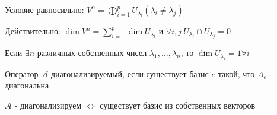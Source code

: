 \documentclass[12pt]{article}
\begin{document}
    \Nota Условие \Ths равносильно: $V^n = \bigoplus_{i=1}^p U_{\lambda_i} (\lambda_i \neq \lambda_j)$

    Действительно: $\dim V^n = \sum_{i=1}^p \dim U_{\lambda_i}$ и $\forall i, j \ U_{\lambda_i} \cap U_{\lambda_j} = 0$

    \Ex Если $\exists n$ различных собственных чисел $\lambda_1, \dots, \lambda_n$, то $\dim U_{\lambda_i} = 1 \forall i$

    \Def Оператор $\mathcal{A}$ диагонализируемый, если существует базис $e$ такой, что $A_e$ - диагональна

    \hypertarget{diagonalizedmatrixtheorem}{}

    \begin{MyTheorem}
        \Ths $\mathcal{A}$ - диагонализируем $\Longleftrightarrow$ существует базис из собственных векторов
    \end{MyTheorem}
\end{document}
